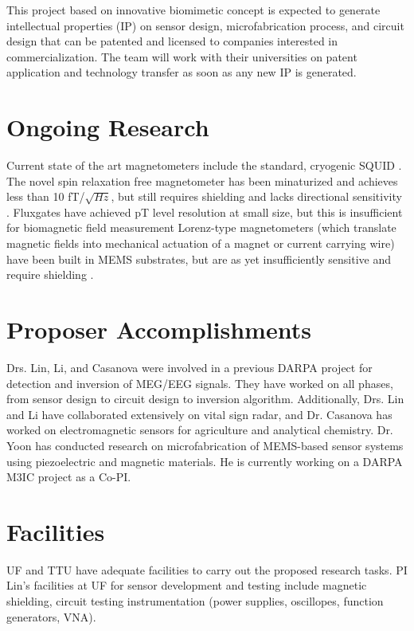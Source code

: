 This project based on innovative biomimetic concept is expected to generate intellectual properties (IP) on sensor design, microfabrication process, and circuit design that can be patented and licensed to companies interested in commercialization. The team will work with their universities on patent application and technology transfer as soon as any new IP is generated. 

\section{Ongoing Research}
Current state of the art magnetometers include the standard, cryogenic SQUID \cite{lenz2006magnetic}. The novel spin relaxation free magnetometer has been minaturized and achieves less than 10 fT/$\sqrt{Hz}$, but still requires shielding and lacks directional sensitivity \cite{shah2013compact}. Fluxgates have achieved pT level resolution at small size, but this is insufficient for biomagnetic field measurement \cite{sasada2002orthogonal,uchiyama2014highly,sasada2014fundamental}  Lorenz-type magnetometers (which translate magnetic fields into mechanical actuation of a magnet or current carrying wire) have been built in MEMS substrates, but are as yet insufficiently sensitive and require shielding \cite{sinha201627,kyynarainen20083d,kumar2015ultra,thompson2009parametrically}.

\section{Proposer Accomplishments}
Drs. Lin, Li, and Casanova were involved in a previous DARPA project for detection and inversion of MEG/EEG signals. They have worked on all phases, from sensor design to circuit design to inversion algorithm. Additionally, Drs. Lin and Li have collaborated extensively on vital sign radar, and Dr. Casanova has worked on electromagnetic sensors for agriculture and analytical chemistry. Dr. Yoon has conducted research on microfabrication of MEMS-based sensor systems using piezoelectric and magnetic materials. He is currently working on a DARPA M3IC project as a Co-PI.

\section{Facilities}
UF and TTU have adequate facilities to carry out the proposed research tasks.
PI Lin's facilities at UF for sensor development and testing include magnetic shielding, circuit testing instrumentation (power supplies, oscillopes, function generators, VNA). 

